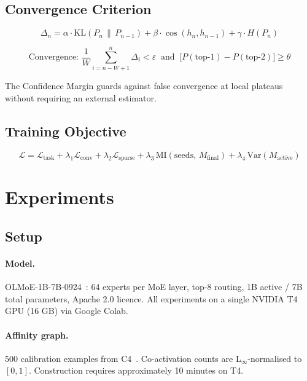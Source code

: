 \documentclass{article}
\begin{document}
\subsection{Convergence Criterion}

\begin{equation}
\Delta_n = \alpha \cdot \mathrm{KL}(P_n \,\|\, P_{n-1})
+ \beta \cdot \cos(h_n, h_{n-1})
+ \gamma \cdot H(P_n)
\end{equation}

\begin{equation}
\text{Convergence: } \frac{1}{W}\sum_{i=n-W+1}^{n}\Delta_i
< \varepsilon \;\;\text{and}\;\;
\bigl[P(\text{top-1}) - P(\text{top-2})\bigr] \geq \theta
\end{equation}

The Confidence Margin guards against false convergence at local
plateaus without requiring an external estimator.

\subsection{Training Objective}

\begin{equation}
\mathcal{L} = \mathcal{L}_{\mathrm{task}}
+ \lambda_1 \mathcal{L}_{\mathrm{conv}}
+ \lambda_2 \mathcal{L}_{\mathrm{sparse}}
+ \lambda_3 \,\mathrm{MI}(\mathrm{seeds},\,M_{\mathrm{final}})
+ \lambda_4 \,\mathrm{Var}(M_{\mathrm{active}})
\label{eq:loss}
\end{equation}

\section{Experiments}
\label{sec:experiments}

\subsection{Setup}

\paragraph{Model.}
OLMoE-1B-7B-0924~\citep{muennighoff2024olmoe}: 64 experts per
MoE layer, top-8 routing, 1B active / 7B total parameters,
Apache 2.0 licence.
All experiments on a single NVIDIA T4 GPU (16 GB) via Google
Colab.

\paragraph{Affinity graph.}
500 calibration examples from C4~\citep{raffel2020c4}.
Co-activation counts are L$_\infty$-normalised to $[0,1]$.
Construction requires approximately 10 minutes on T4.
\end{document}
